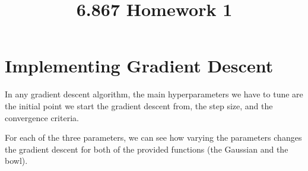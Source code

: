 \documentclass[8pt]{article}
\title{\vspace{-6ex} 6.867 Homework 1}
\author{}
\date{\vspace{-10ex}}
\begin{document}
\maketitle
\thispagestyle{fancy}



\section{Implementing Gradient Descent}

In any gradient descent algorithm, the main hyperparameters we have to tune are the initial point we start the gradient descent from, the step size, and the convergence criteria. 
%
%
%

For each of the three parameters, we can see how varying the parameters changes the gradient descent for both of the provided functions (the Gaussian and the bowl).
\end{document}
